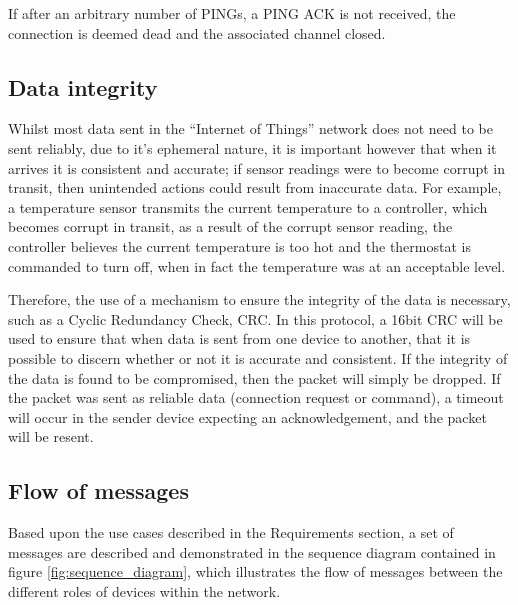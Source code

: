 If after an arbitrary number of PINGs, a PING ACK is not received, the connection is deemed dead and the associated channel closed.

\subsection{Data integrity}
\label{sub:data_integrity}
Whilst most data sent in the ``Internet of Things'' network does not need to be sent reliably, due to it's ephemeral nature, it is important however that when it arrives it is consistent and accurate; if sensor readings were to become corrupt in transit, then unintended actions could result from inaccurate data. For example, a temperature sensor transmits the current temperature to a controller, which becomes corrupt in transit, as a result of the corrupt sensor reading, the controller believes the current temperature is too hot and the thermostat is commanded to turn off, when in fact the temperature was at an acceptable level.

Therefore, the use of a mechanism to ensure the integrity of the data is necessary, such as a Cyclic Redundancy Check, CRC. In this protocol, a 16bit CRC will be used to ensure that when data is sent from one device to another, that it is possible to discern whether or not it is accurate and consistent. If the integrity of the data is found to be compromised, then the packet will simply be dropped. If the packet was sent as reliable data (connection request or command), a timeout will occur in the sender device expecting an acknowledgement, and the packet will be resent. 



\subsection{Flow of messages} %
\label{sub:message_passing}
Based upon the use cases described in the Requirements section, a set of messages are described and demonstrated in the sequence diagram contained in figure \ref{fig:sequence_diagram}, which illustrates the flow of messages between the different roles of devices within the network.

